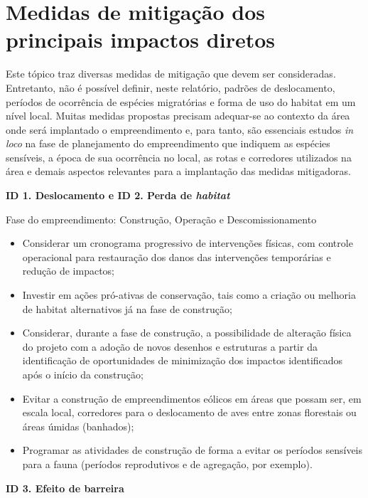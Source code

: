 \documentclass[
  oneside]{scrbook}
\providecommand{\tightlist}{%
  \setlength{\itemsep}{0pt}\setlength{\parskip}{0pt}}
\begin{document}
\hypertarget{medidas-de-mitigauxe7uxe3o-dos-principais-impactos-diretos}{%
\section{Medidas de mitigação dos principais impactos diretos}\label{medidas-de-mitigauxe7uxe3o-dos-principais-impactos-diretos}}

Este tópico traz diversas medidas de mitigação que devem ser consideradas. Entretanto, não é possível definir, neste relatório, padrões de deslocamento, períodos de ocorrência de espécies migratórias e forma de uso do habitat em um nível local. Muitas medidas propostas precisam adequar-se ao contexto da área onde será implantado o empreendimento e, para tanto, são essenciais estudos \emph{in loco} na fase de planejamento do empreendimento que indiquem as espécies sensíveis, a época de sua ocorrência no local, as rotas e corredores utilizados na área e demais aspectos relevantes para a implantação das medidas mitigadoras.

\textbf{ID 1. Deslocamento e ID 2. Perda de \emph{habitat} }

Fase do empreendimento: Construção, Operação e Descomissionamento

\begin{itemize}
\tightlist
\item
  Considerar um cronograma progressivo de intervenções físicas, com controle operacional para restauração dos danos das intervenções temporárias e redução de impactos;
\item
  Investir em ações pró-ativas de conservação, tais como a criação ou melhoria de habitat alternativos já na fase de construção;
\item
  Considerar, durante a fase de construção, a possibilidade de alteração física do projeto com a adoção de novos desenhos e estruturas a partir da identificação de oportunidades de minimização dos impactos identificados após o início da construção;
\item
  Evitar a construção de empreendimentos eólicos em áreas que possam ser, em escala local, corredores para o deslocamento de aves entre zonas florestais ou áreas úmidas (banhados);
\item
  Programar as atividades de construção de forma a evitar os períodos sensíveis para a fauna (períodos reprodutivos e de agregação, por exemplo).
\end{itemize}

\textbf{ID 3. Efeito de barreira}
\end{document}
